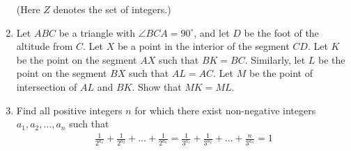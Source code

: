 \documentclass{article}
\begin{document}
\begin{enumerate}
		(Here $Z$ denotes the set of integers.)
	\item  Let $ABC$ be a triangle with $\angle{BCA}=90^{\circ}$, and let $D$ be the foot of the altitude from $C$. Let $X$ be a point in the interior of the segment $CD$. Let $K$ be the point on the segment $AX$ such that $BK = BC$. Similarly, let $L$ be the point on the segment $BX$ such that $AL = AC$. Let $M$ be the point of intersection of $AL$ and $BK$.
		Show that $MK = ML$.
	\item  Find all positive integers $n$ for which there exist non-negative integers $a_{1}, a_{2}, \dots, a_{n}$ such that
		\begin{align}
			\frac{1}{2^{a_{1}}}+\frac{1}{2^{a_{2}}}+ \dots +\frac{1}{2^{a_{n}}}=\frac{1}{3^{a_{1}}}+\frac{1}{3^{a_{2}}}+ \dots +\frac{n}{3^{a_{n}}}=1
		\end{align}
\end{enumerate}
\end{document}
